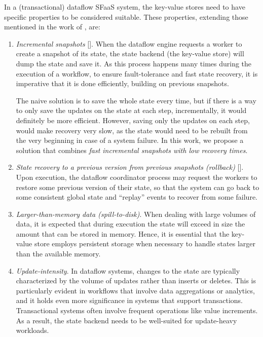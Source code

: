 In a (transactional) dataflow SFaaS system, the key-value stores need to have specific properties to be considered suitable. These properties, extending those mentioned in the work of \cite{faster}, are:

\begin{enumerate}
    \item \textit{Incremental snapshots} [\cite{state-management-apache-flink}].
    When the dataflow engine requests a worker to create a snapshot of its state, the state backend (the key-value store) will dump the state and save it. As this process happens many times during the execution of a workflow, to ensure fault-tolerance and fast state recovery, it is imperative that it is done efficiently, building on previous snapshots.
    
    The naive solution is to save the whole state every time, but if there is a way to only save the updates on the state at each step, incrementally, it would definitely be more efficient. However, saving only the updates on each step, would make recovery very slow, as the state would need to be rebuilt from the very beginning in case of a system failure.
    In this work, we propose a solution that combines \textit{fast incremental snapshots with low recovery times}.

    \item \textit{State recovery to a previous version from previous snapshots (rollback)} [\cite{snapshots-rollbacks,state-management-apache-flink}]. Upon execution, the dataflow coordinator process may request the workers to restore some previous version of their state, so that the system can go back to some consistent global state and ``replay'' events to recover from some failure.
    
    \item \textit{Larger-than-memory data (spill-to-disk)}.
    When dealing with large volumes of data, it is expected that during execution the state will exceed in size the amount that can be stored in memory.
    Hence, it is essential that the key-value store employs persistent storage when necessary to handle states larger than the available memory.

    \item \textit{Update-intensity}.
    In dataflow systems, changes to the state are typically characterized by the volume of updates rather than inserts or deletes.
    This is particularly evident in workflows that involve data aggregations or analytics, and it holds even more significance in systems that support transactions.
    Transactional systems often involve frequent operations like value increments. As a result, the state backend needs to be well-suited for update-heavy workloads.


\end{enumerate}
